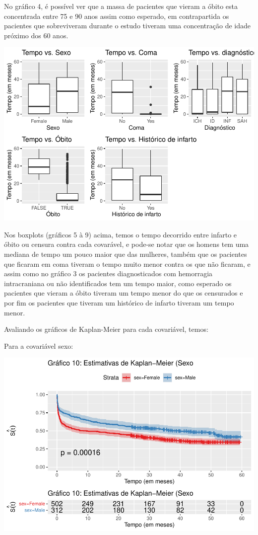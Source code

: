 \documentclass[]{article}
\begin{document}
No gráfico 4, é possível ver que a massa de pacientes que vieram a óbito
esta concentrada entre 75 e 90 anos assim como esperado, em
contrapartida os pacientes que sobreviveram durante o estudo tiveram uma
concentração de idade próximo dos 60 anos.

\begin{center}\includegraphics[width=0.8\linewidth]{Atividade_3_files/figure-latex/unnamed-chunk-6-1} \end{center}

Nos boxplots (gráficos 5 à 9) acima, temos o tempo decorrido entre
infarto e óbito ou censura contra cada covarável, e pode-se notar que os
homens tem uma mediana de tempo um pouco maior que das mulheres, também
que os pacientes que ficaram em coma tiveram o tempo muito menor contra
os que não ficaram, e assim como no gráfico 3 os pacientes
diagnosticados com hemorragia intracraniana ou não identificados tem um
tempo maior, como esperado os pacientes que vieram a óbito tiveram um
tempo menor do que os censurados e por fim os pacientes que tiveram um
histórico de infarto tiveram um tempo menor.

Avaliando os gráficos de Kaplan-Meier para cada covariável, temos:

Para a covariável sexo:

\begin{center}\includegraphics[width=0.8\linewidth]{Atividade_3_files/figure-latex/unnamed-chunk-7-1} \end{center}
\end{document}
